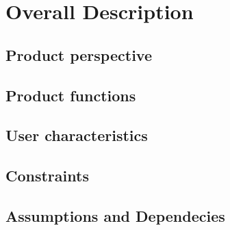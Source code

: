 \section{Overall Description}
\subsection{Product perspective}
\subsection{Product functions}
\subsection{User characteristics}
\subsection{Constraints}
\subsection{Assumptions and Dependecies}

